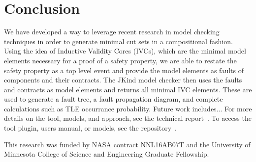 \section{Conclusion}

We have developed a way to leverage recent research in model checking techniques in order to generate minimal cut sets in a compositional fashion. Using the idea of Inductive Validity Cores (IVCs), which are the minimal model elements necessary for a proof of a safety property, we are able to restate the safety property as a top level event and provide the model elements as faults of components and their contracts. The JKind model checker then uses the faults and contracts as model elements and returns all minimal IVC elements. These are used to generate a fault tree, a fault propagation diagram, and complete calculations such as TLE occurrance probability. Future work includes...  For more details on the tool, models, and approach, see the technical report~\cite{SATechReport}. To access the tool plugin, users manual, or models, see the repository~\cite{SAGithub}. 

\vspace{2 mm}
 This research was funded by NASA contract NNL16AB07T and the University of Minnesota College of Science and Engineering Graduate Fellowship.


